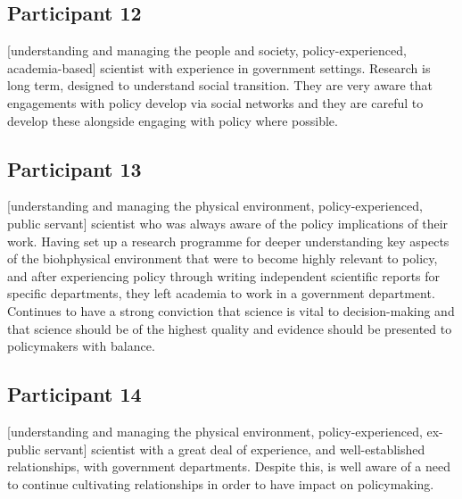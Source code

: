 \subsection{Participant 12}\label{sec:p12}
[understanding and managing the people and society, policy-experienced, academia-based] scientist with experience in government settings. Research is long term, designed to understand social transition. They are very aware that engagements with policy develop via social networks and they are careful to develop these alongside engaging with policy where possible. 

\subsection{Participant 13}\label{sec:p13}
[understanding and managing the physical environment, policy-experienced, public servant] scientist who was always aware of the policy implications of their work. Having set up a research programme for deeper understanding key aspects of the biohphysical environment that were to become highly relevant to policy, and after experiencing policy through writing independent scientific reports for specific departments, they left academia to work in a government department. Continues to have a strong conviction that science is vital to decision-making and that science should be of the highest quality and evidence should be presented to policymakers with balance. 

\subsection{Participant 14}\label{sec:p14}
[understanding and managing the physical environment, policy-experienced, ex-public servant] scientist with a great deal of experience, and well-established relationships, with government departments. Despite this, is well aware of a need to continue cultivating relationships in order to have impact on policymaking. 